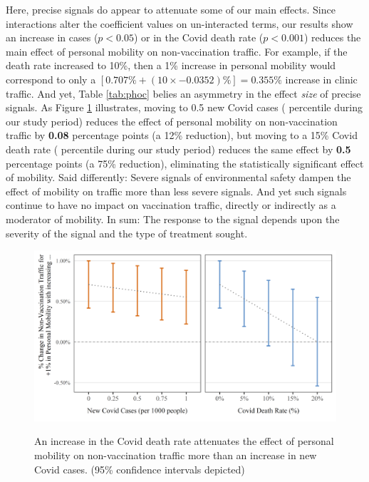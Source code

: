  Here, precise signals do appear to attenuate some of our main effects. Since interactions alter the coefficient values on un-interacted terms, our results show an increase in cases ($p < 0.05$) or in the Covid death rate ($p < 0.001$) reduces the main effect of personal mobility on non-vaccination traffic. For example, if the death rate increased to 10\%, then a 1\% increase in personal mobility would correspond to only a $[0.707\% + (10 \times -0.0352)\%] = 0.355\%$ increase in clinic traffic. And yet, Table \ref{tab:phoc} belies an asymmetry in the effect \textit{size} of precise signals. As Figure \ref{fig:tfk_mod} illustrates, moving to 0.5 new Covid cases ( percentile during our study period) reduces the effect of personal mobility on non-vaccination traffic by \textbf{0.08} percentage points (a 12\% reduction), but moving to a 15\% Covid death rate ( percentile during our study period) reduces the same effect by \textbf{0.5} percentage points (a 75\% reduction), eliminating the statistically significant effect of mobility. Said differently: Severe signals of environmental safety dampen the effect of mobility on traffic more than less severe signals. And yet such signals continue to have no impact on vaccination traffic, directly or indirectly as a moderator of mobility. In sum: The response to the signal depends upon the severity of the signal and the type of treatment sought.
 
\begin{figure}[htbp]
    \centering
    \caption{An increase in the Covid death rate attenuates the effect of personal mobility on non-vaccination traffic more than an increase in new Covid cases. (95\% confidence intervals depicted)} %
    \includegraphics[scale=1]{Figures/VC2/Traffic-Moderation.png}     
    \label{fig:tfk_mod}
\end{figure} 

